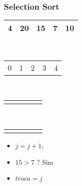 \documentclass{beamer}
\begin{document}
\begin{frame}
    \frametitle{Selection Sort}
    \begin{center}
        \begin{table}
            \begin{tabular}{| p{0.25cm} | p{0.25cm} | p{0.25cm} | p{0.25cm} | p{0.25cm} |}
                \hline
                4 & 20 & 15 & 7 & 10 \\ \hline
            \end{tabular} \\
            \begin{tabular}{p{0.25cm} p{0.25cm} p{0.25cm} p{0.25cm} p{0.25cm}}
                0 & 1 & 2 & 3 & 4
            \end{tabular} \\
            \begin{tabular}{p{0.25cm} p{0.25cm} p{0.25cm} p{0.25cm} p{0.25cm}}
                 & \color{blue}{$\uparrow$} & & \color{red}{$\uparrow$} &
            \end{tabular} \\
            \begin{tabular}{p{0.25cm} p{0.25cm} p{0.25cm} p{0.25cm} p{0.25cm}}
                 & \color{blue}{i} & & \color{red}{j} &
            \end{tabular}
        \end{table}
	\end{center}
    \color{green}{$troca = 2$}
    \begin{itemize}[<+->]
        \item $j = j + 1$;
        \item $15 > 7$ ? Sim
        \item $troca = j$
    \end{itemize}
\end{frame}
\end{document}

